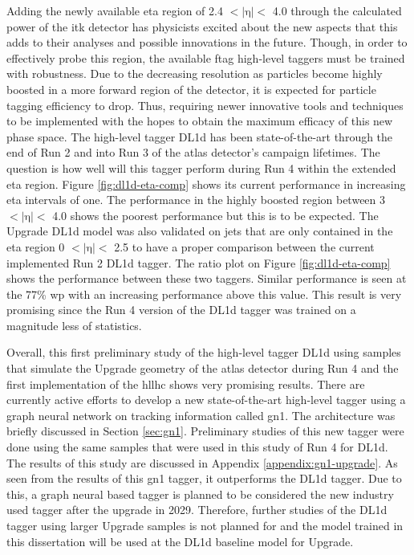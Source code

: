 Adding the newly available eta region of 2.4 $<|\textrm{η}|<$ 4.0 through the calculated power of the \gls{itk} detector has physicists excited about the new 
aspects that this adds to their analyses and possible innovations in the future. Though, in order to effectively probe this region, the available \gls{ftag}
high-level taggers must be trained with robustness. Due to the decreasing resolution as particles become highly boosted in a more forward region of the detector,
it is expected for particle tagging efficiency to drop. Thus, requiring newer innovative tools and techniques to be implemented with the hopes to obtain the maximum efficacy of this new phase space. The high-level tagger DL1d has been state-of-the-art through the end of Run 2 and into Run 3 of the \gls{atlas} detector's 
campaign lifetimes. The question is how well will this tagger perform during Run 4 within the extended eta region. Figure \ref{fig:dl1d-eta-comp} shows its current performance 
in increasing eta intervals of one. The performance in the highly boosted region between 3 $<|\textrm{η}|<$ 4.0 shows the poorest performance but this is 
to be expected. The Upgrade DL1d model was also validated on jets that are only contained in the eta region 0 $<|\textrm{η}|<$ 2.5 to have a proper comparison 
between the current implemented Run 2 DL1d tagger. The ratio plot on Figure \ref{fig:dl1d-eta-comp} shows the performance between these two taggers. Similar performance is seen at 
the 77\% \gls{wp} with an increasing performance above this value. This result is very promising since the Run 4 version of the DL1d tagger was trained on a 
magnitude less of statistics.
\par
Overall, this first preliminary study of the high-level tagger DL1d using samples that simulate the Upgrade geometry of the \gls{atlas} detector during Run 4 
and the first implementation of the \gls{hllhc} shows very promising results.  
There are currently active efforts to develop a new state-of-the-art high-level tagger using a graph neural network on tracking information called \gls{gn1}. 
The architecture was briefly discussed in Section \ref{sec:gn1}. Preliminary studies of this new tagger were done using the same samples that 
were used in this study of Run 4 for DL1d. The results of this study are discussed in Appendix \ref{appendix:gn1-upgrade}. As seen from the results of this \gls{gn1} tagger,
it outperforms the DL1d tagger. Due to this, a graph neural based tagger is planned to be considered the new industry used tagger after the upgrade in 2029. Therefore, 
further studies of the DL1d tagger using larger Upgrade samples is not planned for and the model trained in this dissertation will be used at the DL1d baseline model for Upgrade. 

